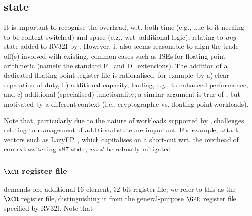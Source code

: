 \subsection{\XCID state}
\label{sec:spec:state}

It is important to recognise the overhead, wrt. both 
time  (e.g., due to it needing to be context switched) 
and 
space (e.g., wrt. additional logic),
relating to {\em any} state added to RV32I by \XCID.
However, it also seems reasonable to align the trade-off(s) involved with 
existing, common cases such as ISEs for floating-point arithmetic (namely
the standard 
F~\cite[Section 8]{SCARV:RV:ISA:I:17}
and
D~\cite[Section 9]{SCARV:RV:ISA:I:17}
extensions).  The addition of a dedicated floating-point register file is
rationalised, for example, by
a) clear separation of duty,
b) additional capacity, leading, e.g., to enhanced performance,
   and
c) additional (specialised) functionality;
a similar argument is true of \XCID, but motivated by a different context
(i.e., cryptographic vs. floating-point workloads).

Note that, particularly due to the nature of workloads supported by \XCID,
challenges relating to management of additional state are important.  For
example, attack vectors such as 
LazyFP~\cite{SCARV:StePre:18}, 
which capitalises on a short-cut wrt. the overhead of context switching
x87 state, {\em must} be robustly mitigated.


\subsubsection{$\XCR$ register file}
\label{sec:spec:state:xcr}

\XCID 
demands one additional 
$16$-element, $32$-bit register file;
we refer to this as the $\XCR$ register file, distinguishing it from the
general-purpose $\GPR$ register file specified by RV32I.
Note that

